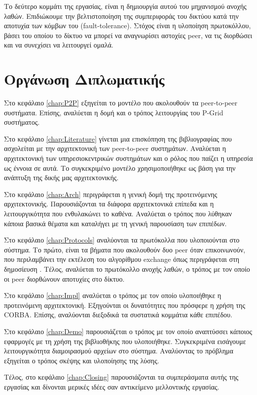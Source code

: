 Το δεύτερο κομμάτι της εργασίας, είναι η δημιουργία αυτού του μηχανισμού 
ανοχής λαθών. Επιδιώκουμε την βελτιστοποίηση της συμπεριφοράς του 
δικτύου κατά την αποτυχία των κόμβων του (fault-tolerance). Στόχος είναι 
η υλοποίηση πρωτοκόλλου, βάσει του οποίου το δίκτυο να μπορεί να αναγνωρίσει 
αστοχίες peer, να τις διορθώσει και να συνεχίσει να λειτουργεί ομαλά.

\section{Οργάνωση Διπλωματικής}

Στο κεφάλαιο \ref{chap:P2P} εξηγείται το μοντέλο που ακολουθούν τα 
peer-to-peer συστήματα. Επίσης, αναλύεται η δομή και ο τρόπος λειτουργίας 
του P-Grid 
\citep{Abererb, Aberer, Abererc, Abererd, Aberer2004, Aberer2003, Aberere, Aberer2002} 
συστήματος.

Στο κεφάλαιο \ref{chap:Literature} γίνεται μια επισκόπηση της βιβλιογραφίας 
που ασχολείται με την αρχιτεκτονική των peer-to-peer συστημάτων. 
Αναλύεται η αρχιτεκτονική των υπηρεσιοκεντρικών συστημάτων και ο ρόλος 
που παίζει η υπηρεσία ως έννοια σε αυτά. Το συγκεκριμένο μοντέλο 
χρησιμοποιήθηκε ως βάση για την ανάπτυξη της δικής μας αρχιτεκτονικής.

Στο κεφάλαιο \ref{chap:Arch} περιγράφεται η γενική δομή της προτεινόμενης 
αρχιτεκτονικής. Παρουσιάζονται τα διάφορα αρχιτεκτονικά επίπεδα και η 
λειτουργικότητα που ενθυλακώνει το καθένα. Αναλύεται ο τρόπος που λύθηκαν 
κάποια βασικά θέματα και καταλήγει με τη γενική παρουσίαση των επιπέδων.

Στο κεφάλαιο \ref{chap:Protocols} αναλύονται τα πρωτόκολλα που υλοποιούνται 
στο σύστημα. Το πρώτο, είναι τα βήματα που ακολουθούν δυο peer όταν 
επικοινωνούν, που περιλαμβάνει την εκτέλεση του αλγορίθμου exchange όπως 
περιγράφεται στη δημοσίευση \citep{Abererb}. Τέλος, αναλύεται το πρωτόκολλο 
ανοχής λαθών, ο τρόπος με τον οποίο οι peer διορθώνουν αποτυχίες στο δίκτυο.

Στο κεφάλαιο \ref{chap:Impl} αναλύεται ο τρόπος με τον οποίο υλοποιήθηκε 
η προτεινόμενη αρχιτεκτονική. Εξηγούνται οι δυνατότητες που πρόσφερε η 
χρήση της CORBA. Επίσης, αναλύονται διεξοδικά τα συστατικά κομμάτια κάθε 
επιπέδου.

Στο κεφάλαιο \ref{chap:Demo} παρουσιάζεται ο τρόπος με τον οποίο αναπτύσσει 
κάποιος εφαρμογές με τη χρήση της βιβλιοθήκης που υλοποιήθηκε. Συγκεκριμένα 
εισάγουμε λειτουργικότητα διαμοιρασμού αρχείων στο σύστημα. Αναλύοντας το 
πρόβλημα εξηγείται ο τρόπος σκέψης και υλοποίησης της λύσης.

Τέλος, στο κεφάλαιο \ref{chap:Closing} παρουσιάζονται τα συμπεράσματα αυτής 
της εργασίας και δίνονται μερικές ιδέες σαν αντικείμενο μελλοντικής εργασίας.
